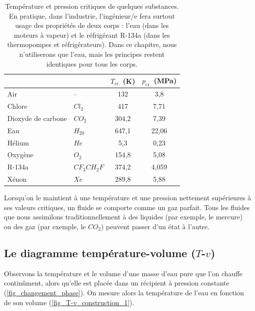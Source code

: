 		\begin{table}
			\begin{center}
			\begin{tabularx}{10cm}{l l S S}
			~  			& ~  		& {$T_\text{cr.}$ (\si{\kelvin})} 	& {$p_\text{cr.}$ (\si{\mega\pascal})}	\\
			\hline
			Air 			& --  		& 132 				& 3,8		\\
			Chlore 		& $Cl_2$		& 417 				& 7,71		\\
			Dioxyde de carbone 	& $CO_2$ 	& 304,2	& 7,39		\\
			Eau 			& $H_20$ 	& 647,1 				& 22,06		\\
			Hélium 		& $He$		& 5,3 				& 0,23		\\
			Oxygène 		& $O_2$		& 154,8				& 5,08		\\
			R-134a 		& $CF_{3}CH_2F$ & 374,2			& 4,059		\\
			Xénon 		& $Xe$ 		& 289,8				& 5,88		\\
			\end{tabularx}
			\end{center}
		\caption{Température et pression critiques de quelques substances.
			En pratique, dans l’industrie, l’ingénieur/e fera surtout usage des propriétés de deux corps : l’eau (dans les moteurs à vapeur) et le réfrigérant R-134a (dans les thermopompes et réfrigérateurs). Dans ce chapitre, nous n’utiliserons que l’eau, mais les principes restent identiques pour tous les corps.}
			\label{tab_exemples_températures_pressions_critiques}
		\end{table}
	

		Lorsqu’on le maintient à une température et une pression nettement supérieures à ses valeurs critiques, un fluide se comporte comme un gaz parfait. Tous les fluides que nous assimilons traditionnellement à des liquides (par exemple, le mercure) ou des gaz (par exemple, le $CO_2$) peuvent passer d’un état à l’autre.


	\subsection{Le diagramme température-volume ($T$-$v$)}
	\label{ch_lv_diagramme_tv}

		Observons la température et le volume d’une masse d’eau pure que l’on chauffe continûment, alors qu’elle est placée dans un récipient à pression constante (\cref{fig_changement_phase}). On mesure alors la température de l’eau en fonction de son volume (\cref{fig_T-v_construction_1}).

